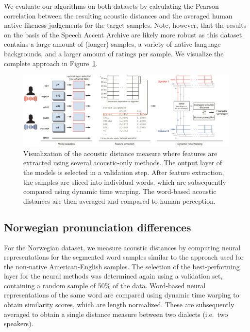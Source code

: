 \documentclass[11pt,a4paper]{article}
\begin{document}

We evaluate our algorithms on both datasets by calculating the Pearson correlation between the resulting acoustic distances and the averaged human native-likeness judgements for the target samples. Note, however, that the results on the basis of the Speech Accent Archive are likely more robust as this dataset contains a large amount of (longer) samples, a variety of native language backgrounds, and a larger amount of ratings per sample.
We visualize the complete approach in Figure~\ref{fig:measure}.

\begin{figure}[t]
  \begin{center}
    \includegraphics[width=\textwidth]{figures/Measure/measure_v5.pdf}
    \caption{Visualization of the acoustic distance measure where features are extracted using several acoustic-only methods. The output layer of the models is selected in a validation step. After feature extraction, the samples are sliced into individual words, which are subsequently compared using dynamic time warping. The word-based acoustic distances are then averaged and compared to human perception.}
    \label{fig:measure}
  \end{center} 
\end{figure}

\subsection{Norwegian pronunciation differences}
For the Norwegian dataset, we measure acoustic distances by computing neural representations for the segmented word samples similar to the approach used for the non-native American-English samples. 
The selection of the best-performing layer for the neural methods was determined again using a validation set, containing a random sample of 50\% of the data.
Word-based neural representations of the same word are compared using dynamic time warping to obtain similarity scores, which are length normalized.
These are subsequently averaged to obtain a single distance measure between two dialects (i.e.~two speakers).
\end{document}
